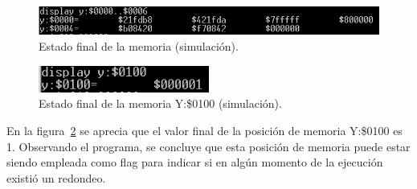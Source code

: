 \begin{figure}[H]
    \centering
    \includegraphics[width=\textwidth]{figs/ej7/1.jpeg}
    \caption{Estado final de la memoria (simulación).}
    \label{fig:ej7_mem}
\end{figure}

\begin{figure}[H]
    \centering
    \includegraphics[width=0.5\textwidth]{figs/ej7/2.jpeg}
    \caption{Estado final de la memoria Y:\$0100 (simulación).}
    \label{fig:ej7_y100}
\end{figure}

En la figura~\ref{fig:ej7_y100} se aprecia que el valor final de la posición de memoria Y:\$0100 es 1. Observando el programa, se concluye que esta posición de memoria puede estar siendo empleada como flag para indicar si en algún momento de la ejecución existió un redondeo. 